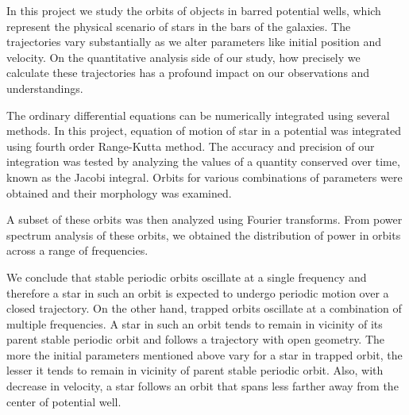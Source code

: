 \documentclass[a4paper]{article}
\begin{document}
	In this project we study the orbits of objects in barred potential wells, which represent the physical scenario of stars in the bars of the galaxies. The trajectories vary substantially as we alter parameters like initial position and velocity. On the quantitative analysis side of our study, how precisely we calculate these trajectories has a profound impact on our observations and understandings.
	
	The ordinary differential equations can be numerically integrated using several methods. In this project, equation of motion of star in a potential was integrated using fourth order Range-Kutta method. The accuracy and precision of our integration was tested by analyzing the values of a quantity conserved over time, known as the Jacobi integral. Orbits for various combinations of parameters were obtained and their morphology was examined. 
	
	A subset of these orbits was then analyzed using Fourier transforms. From power spectrum analysis of these orbits, we obtained the distribution of power in orbits across a range of frequencies.
	
	We conclude that stable periodic orbits oscillate at a single frequency and therefore a star in such an orbit is expected to undergo periodic motion over a closed trajectory. On the other hand, trapped orbits oscillate at a combination of multiple frequencies. A star in such an orbit tends to remain in vicinity of its parent stable periodic orbit and follows a trajectory with open geometry. The more the initial parameters mentioned above vary for a star in trapped orbit, the lesser it tends to remain in vicinity of parent stable periodic orbit. Also, with decrease in velocity, a star follows an orbit that spans less farther away from the center of potential well.  
	
	
	
	\printbibliography[heading=bibintoc]
	
\end{document}
